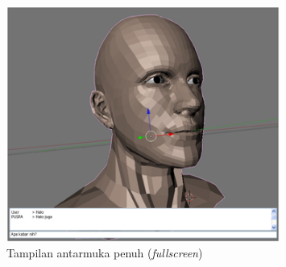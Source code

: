 \begin{figure}
	\centering
		\includegraphics[width=0.8\textwidth]{fullscreen.png}
	\caption{Tampilan antarmuka penuh (\textit{fullscreen})}
	\label{fig:fullscreen}
\end{figure}
